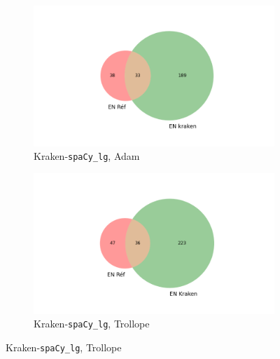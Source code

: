 \begin{figure}
\begin{minipage}{7cm}
  \begin{subfigure}{1\textwidth}
  \includegraphics[width=1\textwidth]{IMAGES/ELTeC_INTERSECTIONS_spaCy3.5.1/ADAM_Mon-village_Kraken-base.txt_spacy-lg-concat.json_intersection.png} 
  \caption{Kraken-\texttt{spaCy\_lg}, Adam}
  \label{fig:ADAM_KRAKEN_SPACY_LG}
  \end{subfigure}
  \end{minipage}
  \begin{minipage}{7cm}
  \begin{subfigure}{1\textwidth}
  \includegraphics[width=1\textwidth]{IMAGES/ELTeC_INTERSECTIONS_spaCy3.5.1/TROLLOPE_Adventure_Kraken.txt_spacy-lg-concat.json_intersection.png} 
  \caption{Kraken-\texttt{spaCy\_lg}, Trollope}
  \label{fig:TROLLOP_DIST_KRAKENBASE_LG}
  \end{subfigure}
  \end{minipage}
  

\end{figure}
